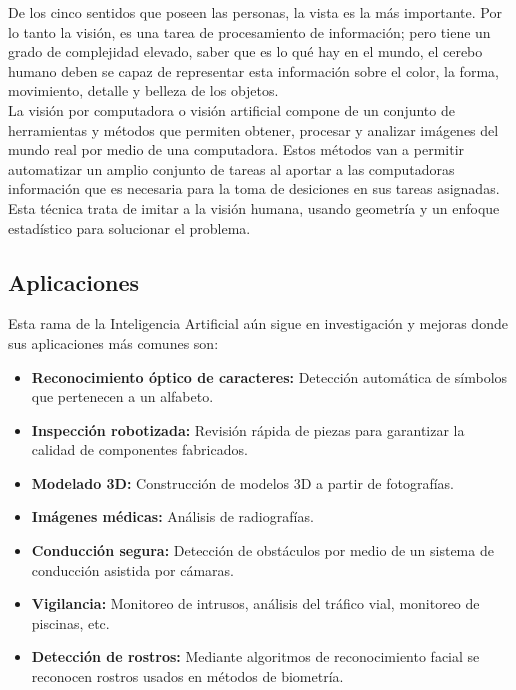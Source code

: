 De los cinco sentidos que poseen las personas, la vista es la más importante. Por lo tanto la visión, es una tarea de procesamiento de información; pero tiene un grado de complejidad elevado, saber que es lo qué hay en el mundo, el cerebo humano deben se capaz de representar esta información sobre el color, la forma, movimiento, detalle y belleza de los objetos. \cite{iaarbook:artificialvision}\\

La visión por computadora o visión artificial compone de un conjunto de herramientas y métodos que permiten obtener, procesar y analizar imágenes del mundo real por medio de una computadora. Estos métodos van a permitir automatizar un amplio conjunto de tareas al aportar a las computadoras información que es necesaria para la toma de desiciones en sus tareas asignadas. Esta técnica trata de imitar a la visión humana, usando geometría y un enfoque estadístico para solucionar el problema.\\

\subsection{Aplicaciones}
Esta rama de la Inteligencia Artificial aún sigue en investigación y mejoras donde sus aplicaciones más comunes son:

\begin{itemize}
    \item \textbf{Reconocimiento óptico de caracteres:} Detección automática de símbolos que pertenecen a un alfabeto.
    \item \textbf{Inspección robotizada:} Revisión rápida de piezas para garantizar la calidad de componentes fabricados.
    \item \textbf{Modelado 3D:} Construcción de modelos 3D a partir de fotografías.
    \item \textbf{Imágenes médicas:} Análisis de radiografías.
    \item \textbf{Conducción segura:} Detección de obstáculos por medio de un sistema de conducción asistida por cámaras.
    \item \textbf{Vigilancia:} Monitoreo de intrusos, análisis del tráfico vial, monitoreo de piscinas, etc.
    \item \textbf{Detección de rostros:} Mediante algoritmos de reconocimiento facial se reconocen rostros usados en métodos de biometría.
\end{itemize}

